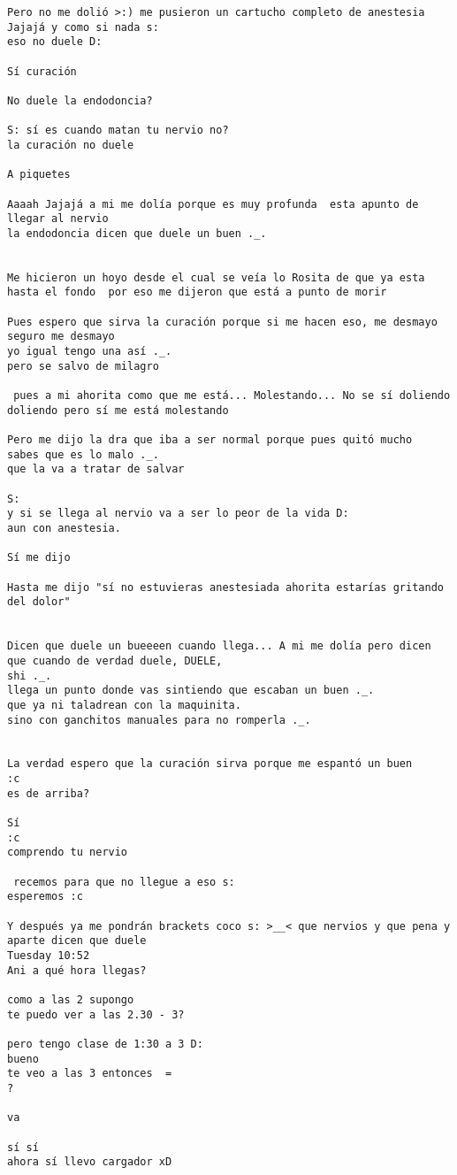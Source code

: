 \begin{verbatim}
Pero no me dolió >:) me pusieron un cartucho completo de anestesia Jajajá y como si nada s:
eso no duele D:

Sí curación

No duele la endodoncia?

S: sí es cuando matan tu nervio no?
la curación no duele

A piquetes

Aaaah Jajajá a mi me dolía porque es muy profunda  esta apunto de llegar al nervio
la endodoncia dicen que duele un buen ._.


Me hicieron un hoyo desde el cual se veía lo Rosita de que ya esta hasta el fondo  por eso me dijeron que está a punto de morir

Pues espero que sirva la curación porque si me hacen eso, me desmayo seguro me desmayo
yo igual tengo una así ._.
pero se salvo de milagro

 pues a mi ahorita como que me está... Molestando... No se sí doliendo doliendo pero sí me está molestando

Pero me dijo la dra que iba a ser normal porque pues quitó mucho 
sabes que es lo malo ._.
que la va a tratar de salvar

S:
y si se llega al nervio va a ser lo peor de la vida D:
aun con anestesia.

Sí me dijo 

Hasta me dijo "sí no estuvieras anestesiada ahorita estarías gritando del dolor"


Dicen que duele un bueeeen cuando llega... A mi me dolía pero dicen que cuando de verdad duele, DUELE,
shi ._.
llega un punto donde vas sintiendo que escaban un buen ._.
que ya ni taladrean con la maquinita.
sino con ganchitos manuales para no romperla ._.


La verdad espero que la curación sirva porque me espantó un buen 
:c
es de arriba?

Sí 
:c
comprendo tu nervio

 recemos para que no llegue a eso s:
esperemos :c

Y después ya me pondrán brackets coco s: >__< que nervios y que pena y aparte dicen que duele
Tuesday 10:52
Ani a qué hora llegas?

como a las 2 supongo
te puedo ver a las 2.30 - 3?

pero tengo clase de 1:30 a 3 D:
bueno
te veo a las 3 entonces  =
?

va 

sí sí
ahora sí llevo cargador xD


\end{verbatim}
